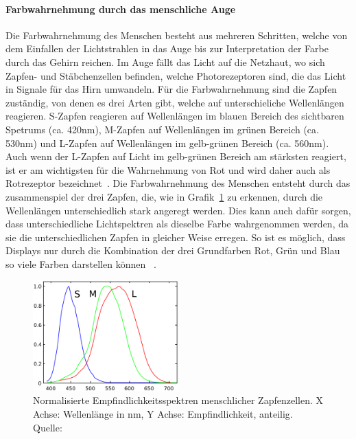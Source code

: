 \documentclass[12pt, a4paper, ngerman]{article}
\begin{document}
\paragraph{Farbwahrnehmung durch das menschliche Auge}
Die Farbwahrnehmung des Menschen besteht aus mehreren Schritten, 
welche von dem Einfallen der Lichtstrahlen in das Auge bis zur Interpretation der Farbe durch das Gehirn reichen.
Im Auge fällt das Licht auf die Netzhaut, wo sich Zapfen- und Stäbchenzellen befinden, 
welche Photorezeptoren sind, die das Licht in Signale für das Hirn umwandeln.
Für die Farbwahrnehmung sind die Zapfen zuständig, von denen es drei Arten gibt, welche auf unterschieliche Wellenlängen reagieren.
S-Zapfen reagieren auf Wellenlängen im blauen Bereich des sichtbaren Spetrums (ca. 420nm), 
M-Zapfen auf Wellenlängen im grünen Bereich (ca. 530nm) und L-Zapfen auf Wellenlängen im gelb-grünen Bereich (ca. 560nm).
Auch wenn der L-Zapfen auf Licht im gelb-grünen Bereich am stärksten reagiert, 
ist er am wichtigsten für die Wahrnehmung von Rot und wird daher auch als Rotrezeptor bezeichnet~\cite{Zapfen_Auge_2023}.
Die Farbwahrnehmung des Menschen entsteht durch das zusammenspiel der drei Zapfen, 
die, wie in Grafik~\ref{fig:LMS} zu erkennen, durch die Wellenlängen unterschiedlich stark angeregt werden. 
Dies kann auch dafür sorgen, dass unterschiedliche Lichtspektren als dieselbe Farbe wahrgenommen werden, 
da sie die unterschiedlichen Zapfen in gleicher Weise erregen. 
So ist es möglich, dass Displays nur durch die Kombination der drei Grundfarben Rot, Grün und Blau 
so viele Farben darstellen können ~\cite{Ottosson_2020}.

\begin{figure}
  \centering
  \includegraphics[width=0.5\textwidth]{Grafiken/LMS.png}
  \caption{Normalisierte Empfindlichkeitsspektren menschlicher Zapfenzellen. X Achse: Wellenlänge in nm, Y Achse: Empfindlichkeit, anteilig. Quelle: \cite{LMS_color_space_2023}}
  \label{fig:LMS}
\end{figure}
\end{document}
